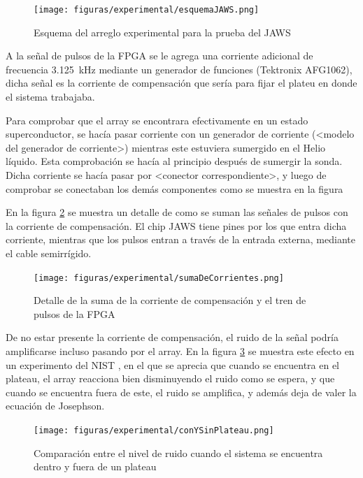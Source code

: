 \documentclass[twoside]{article}
\begin{document}
\begin{multicols}{2}
\begin{figure}[H]
    \centering
    \texttt{[image: figuras/experimental/esquemaJAWS.png]}
    \caption{Esquema del arreglo experimental para la prueba del JAWS}
    \label{fig:experimental_esquemaJAWS}
\end{figure}

A la señal de pulsos de la FPGA se le agrega una corriente adicional de frecuencia \SI{3.125}{\kilo\hertz} mediante un generador de funciones (Tektronix AFG1062), dicha señal es la corriente de compensación que sería para fijar el plateu en donde el sistema trabajaba.

Para comprobar que el array se encontrara efectivamente en un estado superconductor, se hacía pasar corriente con un generador de corriente (<modelo del generador de corriente>) mientras este estuviera sumergido en el Helio líquido. Esta comprobación se hacía al principio después de sumergir la sonda. Dicha corriente se hacía pasar por <conector correspondiente>, y luego de comprobar se conectaban los demás componentes como se muestra en la figura 

En la figura \ref{fig:experimental_sumaDeCorrientes} \cite{kieler2007} se muestra un detalle de como se suman las señales de pulsos con la corriente de compensación. El chip JAWS tiene pines por los que entra dicha corriente, mientras que los pulsos entran a través de la entrada externa, mediante el cable semirrígido.

\begin{figure}[H]
    \centering
    \texttt{[image: figuras/experimental/sumaDeCorrientes.png]}
    \caption{Detalle de la suma de la corriente de compensación y el tren de pulsos de la FPGA}
    \label{fig:experimental_sumaDeCorrientes}
\end{figure}

De no estar presente la corriente de compensación, el ruido de la señal podría amplificarse incluso pasando por el array. En la figura \ref{fig:experimental_conYSinPlateau} se muestra este efecto en un experimento del NIST \cite{quantumLockingRangesNIST}, en el que se aprecia que cuando se encuentra en el plateau, el array reacciona bien disminuyendo el ruido como se espera, y que cuando se encuentra fuera de este, el ruido se amplifica, y además deja de valer la ecuación de Josephson.

\begin{figure}[H]
    \centering
    \texttt{[image: figuras/experimental/conYSinPlateau.png]}
    \caption{Comparación entre el nivel de ruido cuando el sistema se encuentra dentro y fuera de un plateau}
    \label{fig:experimental_conYSinPlateau}
\end{figure}


\end{multicols}
\end{document}
